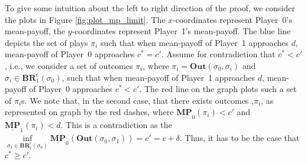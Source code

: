 To give some intuition about the left to right direction of the proof, we consider the plots in Figure \ref{fig:plot_mp_limit}. The $x$-coordinates represent Player~0's mean-payoff, the $y$-coordinates represent Player~1's mean-payoff. The blue line depicts the set of plays $\pi_i$ such that when mean-payoff of Player~1 approaches $d$, mean-payoff of Player~0 approaches $c^* = c'$. Assume for contradiction that $c^* < c'$, i.e., we consider a set of outcomes $\pi_i$, where $\pi_i=\mathbf{Out}(\sigma_0, \sigma_i)$ and $\sigma_i \in \mathbf{BR}_1^{\epsilon}(\sigma_0)$, such that when mean-payoff of Player~1 approaches $d$, mean-payoff of Player~0 approaches $c^* < c'$. The red line on the graph plots such a set of $\pi_i$s. We note that, in the second case, that there exists outcomes ,$\pi_i$, as represented on graph by the red dashes, where $\underline{\mathbf{MP}}_0(\pi_i) < c'$ and $\underline{\mathbf{MP}}_1(\pi_i) < d$. This is a contradiction as the $\inf\limits_{\sigma_1 \in \mathbf{BR}_1^{\epsilon}(\sigma_0)} \underline{\mathbf{MP}}_0(\mathbf{Out}(\sigma_0, \sigma_1)) = c' = c + \delta$. Thus, it has to be the case that $c^* \geqslant c'$. 